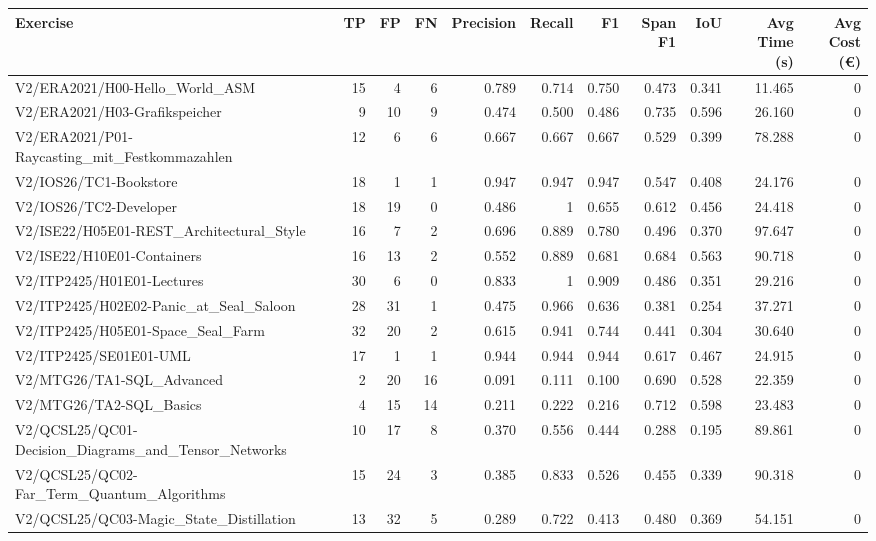 \begin{tabular}{lrrrrrrrrrr}
Exercise & TP & FP & FN & Precision & Recall & F1 & Span F1 & IoU & Avg Time (s) & Avg Cost (€) \\
\hline
V2/ERA2021/H00-Hello\_World\_ASM & 15 & 4 & 6 & 0.789 & 0.714 & 0.750 & 0.473 & 0.341 & 11.465 & 0 \\
V2/ERA2021/H03-Grafikspeicher & 9 & 10 & 9 & 0.474 & 0.500 & 0.486 & 0.735 & 0.596 & 26.160 & 0 \\
V2/ERA2021/P01-Raycasting\_mit\_Festkommazahlen & 12 & 6 & 6 & 0.667 & 0.667 & 0.667 & 0.529 & 0.399 & 78.288 & 0 \\
V2/IOS26/TC1-Bookstore & 18 & 1 & 1 & 0.947 & 0.947 & 0.947 & 0.547 & 0.408 & 24.176 & 0 \\
V2/IOS26/TC2-Developer & 18 & 19 & 0 & 0.486 & 1 & 0.655 & 0.612 & 0.456 & 24.418 & 0 \\
V2/ISE22/H05E01-REST\_Architectural\_Style & 16 & 7 & 2 & 0.696 & 0.889 & 0.780 & 0.496 & 0.370 & 97.647 & 0 \\
V2/ISE22/H10E01-Containers & 16 & 13 & 2 & 0.552 & 0.889 & 0.681 & 0.684 & 0.563 & 90.718 & 0 \\
V2/ITP2425/H01E01-Lectures & 30 & 6 & 0 & 0.833 & 1 & 0.909 & 0.486 & 0.351 & 29.216 & 0 \\
V2/ITP2425/H02E02-Panic\_at\_Seal\_Saloon & 28 & 31 & 1 & 0.475 & 0.966 & 0.636 & 0.381 & 0.254 & 37.271 & 0 \\
V2/ITP2425/H05E01-Space\_Seal\_Farm & 32 & 20 & 2 & 0.615 & 0.941 & 0.744 & 0.441 & 0.304 & 30.640 & 0 \\
V2/ITP2425/SE01E01-UML & 17 & 1 & 1 & 0.944 & 0.944 & 0.944 & 0.617 & 0.467 & 24.915 & 0 \\
V2/MTG26/TA1-SQL\_Advanced & 2 & 20 & 16 & 0.091 & 0.111 & 0.100 & 0.690 & 0.528 & 22.359 & 0 \\
V2/MTG26/TA2-SQL\_Basics & 4 & 15 & 14 & 0.211 & 0.222 & 0.216 & 0.712 & 0.598 & 23.483 & 0 \\
V2/QCSL25/QC01-Decision\_Diagrams\_and\_Tensor\_Networks & 10 & 17 & 8 & 0.370 & 0.556 & 0.444 & 0.288 & 0.195 & 89.861 & 0 \\
V2/QCSL25/QC02-Far\_Term\_Quantum\_Algorithms & 15 & 24 & 3 & 0.385 & 0.833 & 0.526 & 0.455 & 0.339 & 90.318 & 0 \\
V2/QCSL25/QC03-Magic\_State\_Distillation & 13 & 32 & 5 & 0.289 & 0.722 & 0.413 & 0.480 & 0.369 & 54.151 & 0 \\
\end{tabular}
